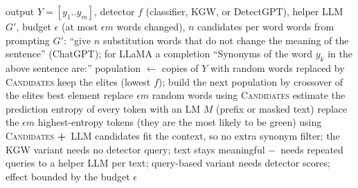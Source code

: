 \documentclass[10pt,a4paper,twocolumn]{article}
\newcommand{\pro}[1]{\Statex\textcolor{proc}{\textbf{+}\ #1}}
\newcommand{\con}[1]{\Statex\textcolor{conc}{\textbf{$-$}\ #1}}
\begin{document}
\begin{algorithm}[H]\small
\caption{LLM word substitution against detectors (Shi et al.\ 2023, red teaming)}
\begin{algorithmic}[1]
\Require output $Y=[y_1..y_m]$, detector $f$ (classifier, KGW, or DetectGPT), helper LLM $G'$, budget $\epsilon$ (at most $\epsilon m$ words changed), $n$ candidates per word
 
 \State \Return words from prompting $G'$: ``give $n$ substitution words that do not change the meaning of the sentence'' (ChatGPT); for LLaMA a completion ``Synonyms of the word $y_k$ in the above sentence are:''
\EndFunction
{} 
 \State population $\gets$ copies of $Y$ with random words replaced by \textsc{Candidates}
  \State keep the elites (lowest $f$); build the next population by crossover of the elites \EndFor
 \State \Return best element 
\EndProcedure
{}
  \State replace $\epsilon m$ random words using \textsc{Candidates}
 \Else {}
  \State estimate the prediction entropy of every token with an LM $M$ (prefix or masked text)
  \State replace the $\epsilon m$ highest-entropy tokens (they are the most likely to be green) using \textsc{Candidates}
 \EndIf
\EndProcedure
\pro{LLM candidates fit the context, so no extra synonym filter; the KGW variant needs no detector query; text stays meaningful}
\con{needs repeated queries to a helper LLM per text; query-based variant needs detector scores; effect bounded by the budget $\epsilon$}
\end{algorithmic}
\end{algorithm}
\end{document}
